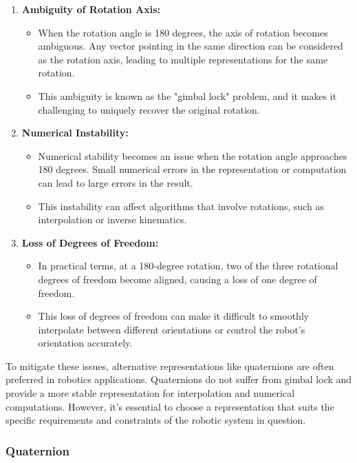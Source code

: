 \documentclass[conference]{IEEEtran}
\begin{document}
\begin{enumerate}
  \item \textbf{Ambiguity of Rotation Axis:}
    \begin{itemize}
      \item When the rotation angle is 180 degrees, the axis of rotation becomes ambiguous. Any vector pointing in the same direction can be considered as the rotation axis, leading to multiple representations for the same rotation.
      \item This ambiguity is known as the "gimbal lock" problem, and it makes it challenging to uniquely recover the original rotation.
    \end{itemize}
  
  \item \textbf{Numerical Instability:}
    \begin{itemize}
      \item Numerical stability becomes an issue when the rotation angle approaches 180 degrees. Small numerical errors in the representation or computation can lead to large errors in the result.
      \item This instability can affect algorithms that involve rotations, such as interpolation or inverse kinematics.
    \end{itemize}

  \item \textbf{Loss of Degrees of Freedom:}
    \begin{itemize}
      \item In practical terms, at a 180-degree rotation, two of the three rotational degrees of freedom become aligned, causing a loss of one degree of freedom.
      \item This loss of degrees of freedom can make it difficult to smoothly interpolate between different orientations or control the robot's orientation accurately.
    \end{itemize}
\end{enumerate}

To mitigate these issues, alternative representations like quaternions are often preferred in robotics applications. Quaternions do not suffer from gimbal lock and provide a more stable representation for interpolation and numerical computations. However, it's essential to choose a representation that suits the specific requirements and constraints of the robotic system in question.

\vspace{10px}
\subsubsection{Quaternion}
\end{document}
